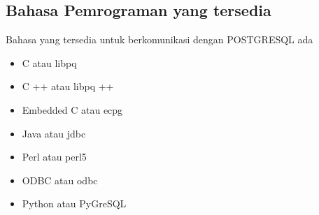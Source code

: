 \subsection {Bahasa Pemrograman yang tersedia}
Bahasa yang tersedia untuk berkomunikasi dengan POSTGRESQL ada
 \begin {itemize}
	\item C atau libpq
	\item C ++ atau libpq ++
	\item Embedded C atau ecpg
	\item Java atau jdbc
	\item Perl atau perl5
	\item ODBC atau odbc
	\item Python atau PyGreSQL
\end {itemize}
